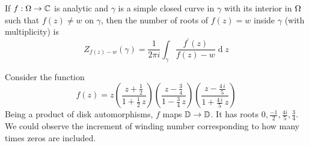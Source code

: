 \documentclass[12pt]{article}
\renewcommand{\d}{\ensuremath{\operatorname{d}}}
\begin{document}
\begin{corollary}
    If $f:\Omega\to\mathbb{C}$ is analytic and $\gamma$ is a simple closed curve in $\gamma$ with its interior in $\Omega$ such that $f(z)\neq w$ on $\gamma$, then the number of roots of $f(z)=w$ inside $\gamma$ (with multiplicity) is $$Z_{f(z)-w}(\gamma)=\frac{1}{2\pi i}\int_{\gamma}\frac{f^{\prime}(z)}{f(z)-w}\d z$$
\end{corollary}

\eg Consider the function \[f(z)=z(\frac{z+\frac{1}{2}}{1+\frac{1}{2}\,z})(\frac{z-\frac{3}{4}}{1-\frac{3}{4}\,z})(\frac{z-\frac{4\,i}{5}}{1+\frac{4\,i}{5}\,z})\] Being a product of disk automorphisms, $f$ maps $\mathbb{D}\to\mathbb{D}$. It has roots $0,\frac{-1}{2}, \frac{4i}{5}, \frac{3}{4}$. We could observe the increment of winding number corresponding to how many times zeros are included.
\end{document}
